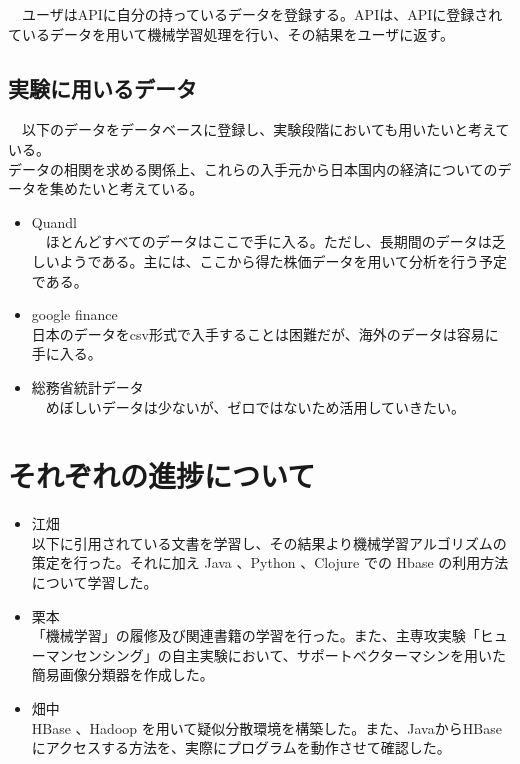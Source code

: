 \documentclass{scrartcl}
\begin{document}
　ユーザはAPIに自分の持っているデータを登録する。APIは、APIに登録されているデータを用いて機械学習処理を行い、その結果をユーザに返す。\\

\subsection{実験に用いるデータ}
\label{sec:org3a61408}
　以下のデータをデータベースに登録し、実験段階においても用いたいと考えている。\\
   データの相関を求める関係上、これらの入手元から日本国内の経済についてのデータを集めたいと考えている。\\

\begin{itemize}
\item Quandl\\
　ほとんどすべてのデータはここで手に入る。ただし、長期間のデータは乏しいようである。主には、ここから得た株価データを用いて分析を行う予定である。\\
\item google finance\\
日本のデータをcsv形式で入手することは困難だが、海外のデータは容易に手に入る。\\
\item 総務省統計データ\\
　めぼしいデータは少ないが、ゼロではないため活用していきたい。\\
\end{itemize}

\section{それぞれの進捗について}
\label{sec:org4e0996c}
\begin{itemize}
\item 江畑\\
以下に引用されている文書を学習し、その結果より機械学習アルゴリズムの策定を行った。それに加え Java 、Python 、Clojure での Hbase の利用方法について学習した。\\
\item 栗本\\
「機械学習」の履修及び関連書籍の学習を行った。また、主専攻実験「ヒューマンセンシング」の自主実験において、サポートベクターマシンを用いた簡易画像分類器を作成した。\\
\item 畑中\\
HBase 、Hadoop を用いて疑似分散環境を構築した。また、JavaからHBaseにアクセスする方法を、実際にプログラムを動作させて確認した。\\
\end{itemize}
\end{document}
